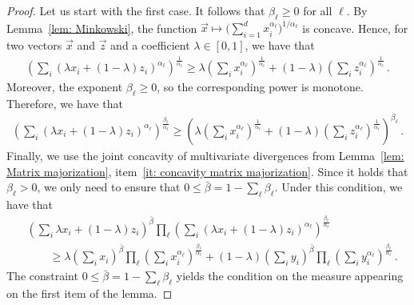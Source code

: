 \documentclass[aps,pra,11pt,onecolumn,nofootinbib,tightenlines]{revtex4-2}
\theoremstyle{definition}
\begin{document}
\begin{proof}
    Let us start with the first case. It follows that $\beta_\ell \geq 0$ for all $\ell$. By Lemma~\ref{lem: Minkowski}, the function $\vec{x} \mapsto \big(\sum_{i=1}^d x_i^{\alpha_\ell}\big)^{1/\alpha_\ell}$ is concave. Hence, for two vectors $\vec{x}$ and $\vec{z}$ and a coefficient $\lambda \in [0,1]$, we have that
\begin{align}
    \left(\sum_{i} (\lambda x_i+(1-\lambda)z_i)^{\alpha_\ell}\right)^\frac{1}{\alpha_\ell} \geq \lambda \left(\sum_{i} x_i^{\alpha_\ell}\right)^\frac{1}{\alpha_\ell} + (1-\lambda) \left(\sum_{i}  z_i^{\alpha_\ell}\right)^\frac{1}{\alpha_\ell} \,.
\end{align}
Moreover, the exponent $\beta_\ell \geq 0$, so the corresponding power is monotone. Therefore, we have that
\begin{align}
    \left(\sum_{i} (\lambda x_i+(1-\lambda)z_i)^{\alpha_\ell}\right)^{\frac{\beta_\ell}{\alpha_\ell}} \geq \left(\lambda \left(\sum_{i} x_i^{\alpha_\ell}\right)^\frac{1}{\alpha_\ell} + (1-\lambda) \left(\sum_{i}  z_i^{\alpha_\ell}\right)^\frac{1}{\alpha_\ell}\right)^{\beta_\ell} \,.
\end{align}
Finally, we use the joint concavity of multivariate divergences from Lemma~\ref{lem: Matrix majorization}, item~\ref{it: concavity matrix majorization}. Since it holds that $\beta_\ell >0$, we only need to ensure that $0 \leq \bar{\beta}= 1- \sum_\ell\beta_\ell $. Under this condition, we have that
\begin{align}
    &\left(\sum_{i} \lambda x_i+(1-\lambda )z_i \right)^{\bar{\beta}} \prod_{\ell} \left(\sum_{i} (\lambda x_i+(1-\lambda ) z_i)^{\alpha_\ell} \right)^{\frac{\beta_\ell}{\alpha_\ell}} \\
    &\qquad \geq \lambda \left(\sum_{i} x_i \right)^{\bar{\beta}} \prod_{\ell} \left(\sum_{i} x_i^{\alpha_\ell} \right)^{\frac{\beta_\ell}{\alpha_\ell}} + (1-\lambda) \left(\sum_{i} y_i \right)^{\bar{\beta}} \prod_{\ell} \left(\sum_{i} y_i^{\alpha_\ell} \right)^{\frac{\beta_\ell}{\alpha_\ell}} \,.
\end{align}
The constraint $ 0 \leq \bar{\beta} =1-\sum_\ell\beta_\ell$ yields the condition on the measure appearing on the first item of the lemma. %

\bigskip


\end{proof}
\end{document}
